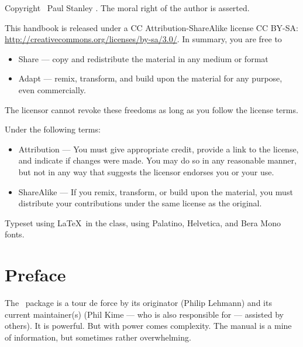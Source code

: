 \maketitle

\strut\vspace{10cm}

Copyright \textcopyright\ Paul Stanley \releasedate. The moral right of the author is asserted.

\vspace{2pc}

{\small This handbook is released under a CC Attribution-ShareAlike
  license CC BY-SA:
  \url{http://creativecommons.org/licenses/by-sa/3.0/}. In summary,
  you are free to
\begin{itemize}
\item Share --- copy and redistribute the material in any medium or
  format
\item Adapt --- remix, transform, and build upon the material for any
  purpose, even commercially.
\end{itemize}
The licensor cannot revoke these freedoms as long as you follow the
license terms.

Under the following terms:
\begin{itemize}
\item Attribution --- You must give appropriate credit, provide a link
  to the license, and indicate if changes were made. You may do so in
  any reasonable manner, but not in any way that suggests the licensor
  endorses you or your use.
\item ShareAlike --- If you remix, transform, or build upon the
  material, you must distribute your contributions under the same
  license as the original.
\end{itemize}
}

\vspace{2pc} Typeset using \LaTeX\ in the  class,
using Palatino, Helvetica, and Bera Mono fonts.  \cleardoublepage

\tableofcontents

\chapter{Preface}

The \biblatex\ package is a tour de force by its originator (Philip
Lehmann) and its current maintainer(s) (Phil Kime --- who is also
responsible for  --- assisted by others). It is
powerful. But with power comes complexity. The manual is a mine of
information, but sometimes rather overwhelming.

